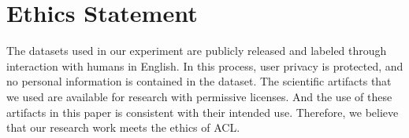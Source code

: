 \section*{Ethics Statement}
\label{subsec:ethics} 
The datasets used in our experiment are publicly released and labeled through interaction with humans in English. In this process, user privacy is protected, and no personal information is contained in the dataset. The scientific artifacts that we used are available for research with permissive licenses. And the use of these artifacts in this paper is consistent with their intended use. Therefore, we believe that our research work meets the ethics of ACL. 



